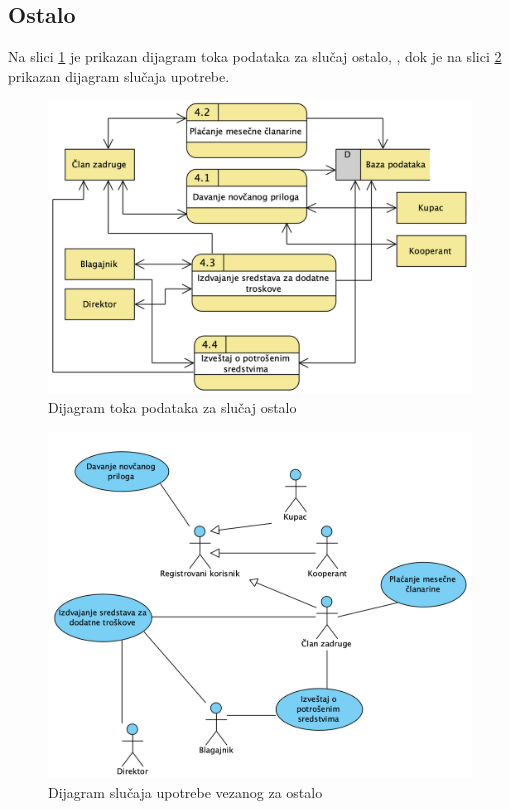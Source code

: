 \documentclass[a4paper]{article}
\begin{document}
\subsection{Ostalo}
Na slici \ref{dtp_ostalo} je prikazan dijagram toka podataka za slučaj ostalo, , dok je na slici \ref{dslucup_ostalo} prikazan dijagram slučaja upotrebe.
\begin{figure}[h!]
    \centering
    \includegraphics[scale=0.64]{images/dtp_ostalo.png}
    \caption{Dijagram toka podataka za slučaj ostalo}
    \label{dtp_ostalo}
\end{figure}

\begin{figure}[h!]
    \centering
    \includegraphics[scale=0.64]{images/dslucup_ostalo.png}
    \caption{Dijagram slučaja upotrebe vezanog za ostalo}
    \label{dslucup_ostalo}
\end{figure}
\end{document}
